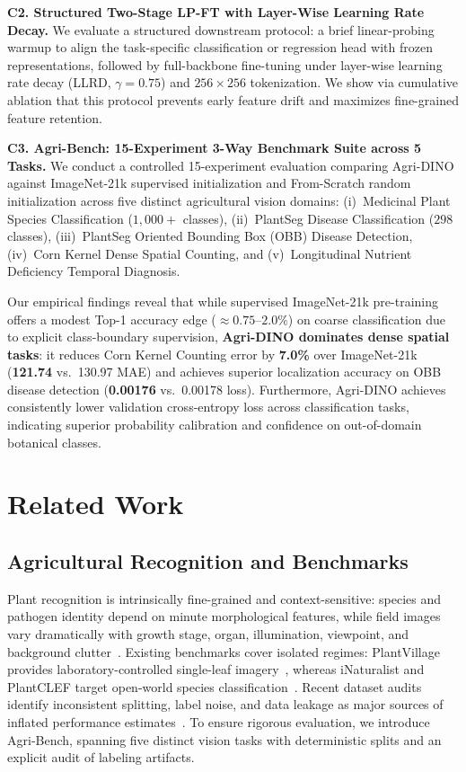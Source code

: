 \documentclass[10pt,twocolumn,letterpaper]{article}
\begin{document}
\noindent\textbf{C2. Structured Two-Stage LP-FT with Layer-Wise Learning Rate Decay.}
We evaluate a structured downstream protocol: a brief linear-probing warmup to align the task-specific classification or regression head with frozen representations, followed by full-backbone fine-tuning under layer-wise learning rate decay (LLRD, $\gamma{=}0.75$) and $256\times256$ tokenization. We show via cumulative ablation that this protocol prevents early feature drift and maximizes fine-grained feature retention.

\noindent\textbf{C3. Agri-Bench: 15-Experiment 3-Way Benchmark Suite across 5 Tasks.}
We conduct a controlled 15-experiment evaluation comparing Agri-DINO against ImageNet-21k supervised initialization and From-Scratch random initialization across five distinct agricultural vision domains: (i)~Medicinal Plant Species Classification ($1,000+$ classes), (ii)~PlantSeg Disease Classification ($298$ classes), (iii)~PlantSeg Oriented Bounding Box (OBB) Disease Detection, (iv)~Corn Kernel Dense Spatial Counting, and (v)~Longitudinal Nutrient Deficiency Temporal Diagnosis.

Our empirical findings reveal that while supervised ImageNet-21k pre-training offers a modest Top-1 accuracy edge ($\approx 0.75\text{--}2.0\%$) on coarse classification due to explicit class-boundary supervision, \textbf{Agri-DINO dominates dense spatial tasks}: it reduces Corn Kernel Counting error by \textbf{7.0\%} over ImageNet-21k (\textbf{121.74} vs.\ 130.97 MAE) and achieves superior localization accuracy on OBB disease detection (\textbf{0.00176} vs.\ 0.00178 loss). Furthermore, Agri-DINO achieves consistently lower validation cross-entropy loss across classification tasks, indicating superior probability calibration and confidence on out-of-domain botanical classes.

\section{Related Work}

\subsection{Agricultural Recognition and Benchmarks}
Plant recognition is intrinsically fine-grained and context-sensitive: species and pathogen identity depend on minute morphological features, while field images vary dramatically with growth stage, organ, illumination, viewpoint, and background clutter~\cite{picek2022plant,barbedo2022representativeness}. Existing benchmarks cover isolated regimes: PlantVillage provides laboratory-controlled single-leaf imagery~\cite{hughes2016open}, whereas iNaturalist and PlantCLEF target open-world species classification~\cite{vanhorn2018inaturalist,goeau2022plantclef}. Recent dataset audits identify inconsistent splitting, label noise, and data leakage as major sources of inflated performance estimates~\cite{xu2024datasets,noyan2022bias}. To ensure rigorous evaluation, we introduce Agri-Bench, spanning five distinct vision tasks with deterministic splits and an explicit audit of labeling artifacts.
\end{document}
